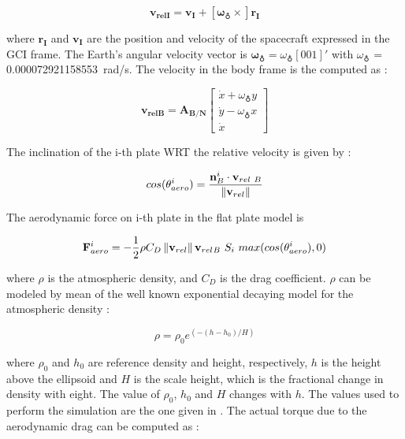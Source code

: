 \documentclass[11pt,a4paper]{report}
\begin{document}
\begin{equation}
 \mathbf{v_{relI}} =  \mathbf{v_I} + [\mathbf{\omega_{\earth} \times}] \mathbf{r_I}
\end{equation}

where $\mathbf{r_I}$ and $\mathbf{v_I}$ are the position and velocity of the spacecraft expressed in the GCI frame. 
The Earth’s angular velocity vector is $\mathbf{\omega_{\earth}} = \omega_{\earth}[0 0 1]'$ with $\omega_{\earth}$ = \SI{0.000072921158553}{\radian/\second}.
The velocity in the body frame is the computed as : 

\begin{equation}
 \mathbf{v_{relB}} = \mathbf{A_{B/N}}   \begin{bmatrix} \dot{x} + \omega_{\earth} y \\ \dot{y} - \omega_{\earth} x \\ \dot{x} \end{bmatrix}
\end{equation}

The inclination of the i-th plate WRT the relative velocity is given by : 

\begin{equation}
 cos(\theta_{aero}^{i}) = \frac{\mathbf{n}_{B}^{i} \cdot \mathbf{v}_{rel\ B}}{\norm{\mathbf{v}_{rel}}}
\end{equation}

The aerodynamic force on i-th plate in the flat plate model is

\begin{equation}
 \mathbf{F}_{aero}^{i} = - \frac{1}{2} \rho C_{D} \norm{\mathbf{v}_{rel}} \mathbf{v}_{rel_{} B}\ S_{i}\ max(cos(\theta_{aero}^{i}),0)
\end{equation}

where $\rho$ is the atmospheric density, and $C_D$ is the drag coefficient.  
$\rho$ can be modeled by mean of the well known exponential decaying model for the atmospheric density :

\begin{equation}
 \rho = \rho_{0} e^{(-(h-h_{0})/H)}
\end{equation}

where $\rho_{0}$ and $h_{0}$ are reference density and height, respectively, $h$ is the height above the ellipsoid and $H$ is the scale height, which is the fractional change in density with eight.
The value of $\rho_{0}$, $h_{0}$  and $H$ changes with $h$. 
The values used to perform the simulation are the one given in \cite{Ref:Books:Fundamentals}.
The actual torque due to the aerodynamic drag can be computed as : 
\end{document}
